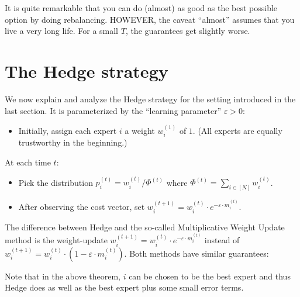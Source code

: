 
It is quite remarkable that you can do (almost) as good as the best possible option by doing
rebalancing. HOWEVER, the caveat ``almost'' assumes that you live a very long life. For a small $T$,
the guarantees get slightly worse.

\section{The Hedge strategy}

We now explain and analyze the Hedge strategy for the setting introduced in the last section. It is
parameterized by the ``learning parameter'' $\varepsilon>0$:
\begin{itemize}
  \item Initially, assign each expert $i$ a weight $w_i^{(1)}$ of $1$. (All experts are equally
    trustworthy in the beginning.)
\end{itemize}
At each time $t$:
\begin{itemize}
  \item Pick the distribution $p_i^{(t)}=w_i^{(t)}/\Phi^{(t)}$ where
    $\Phi^{(t)}=\sum_{i\in[N]}w_i^{(t)}$.
  \item After observing the cost vector, set $w_i^{(t+1)}=w_i^{(t)}\cdot e^{-\varepsilon\cdot m_i^{(t)}}$.
\end{itemize}
The difference between Hedge and the so-called Multiplicative Weight Update method is the
weight-update $w_i^{(t+1)}=w_i^{(t)}\cdot e^{-\varepsilon\cdot m_i^{(t)}}$ instead of
$w_i^{(t+1)}=w_i^{(t)}\cdot(1-\varepsilon\cdot m_i^{(t)})$. Both methods have similar guarantees:

\label{thm:hedge}

Note that in the above theorem, $i$ can be chosen to be the best expert and thus Hedge does as well
as the best expert plus some small error terms.

